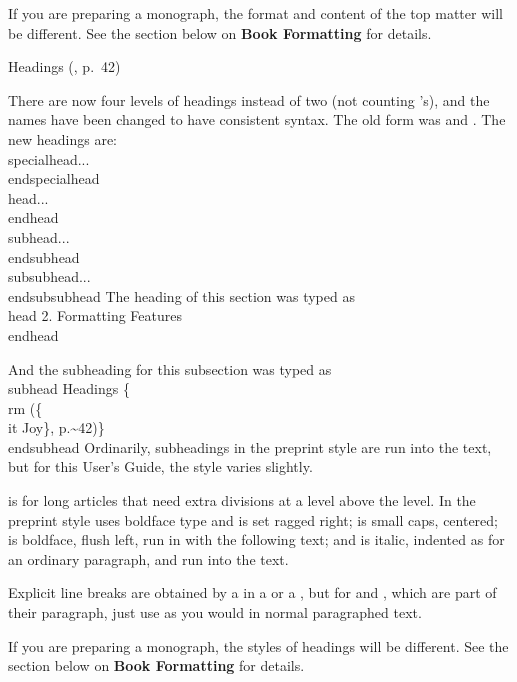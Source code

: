 If you are preparing a monograph, the format and content of the top matter
will be different.  See the section below on {\bf Book Formatting} for
details.


\subhead Headings {\rm (\Joy, p.~42)}
\endsubhead

There are now four levels of headings instead of two (not counting
's), and the names have been changed to have
consistent syntax.  The old form was
 and .  The new
headings are:
\beginexample{}
\\specialhead...\\endspecialhead
\\head...\\endhead
\\subhead...\\endsubhead
\\subsubhead...\\endsubsubhead
\endexample
\noindent The heading of
this section was typed as
\beginexample{}
\\head 2. Formatting Features
\\endhead
\endexample

\noindent And the subheading for this subsection was typed as
\beginexample{}
\\subhead Headings \{\\rm (\{\\it Joy\}, p.\~{ }42)\}
\\endsubhead
\endexample
\noindent
Ordinarily, subheadings in the preprint style are run into the text, but for
this User's Guide, the style varies slightly.

\indent{} is for long articles that need extra divisions at
a level above the  level. In the preprint style
 uses boldface type and is set ragged right; 
is small caps, centered;  is boldface, flush left,
run in with the following text; and
 is italic, indented as for an ordinary paragraph, and run
into the text.

Explicit line breaks are obtained by a \ttcs{\\} in a  or a
, but for  and ,
which are part of their paragraph, just use  as
you would in normal paragraphed text.

If you are preparing a monograph, the styles of headings will be different.
See the section below on {\bf Book Formatting} for details.


